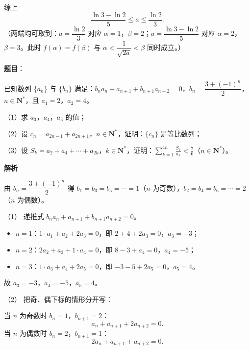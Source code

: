 \begin{answer}
综上
\nopagebreak[4]
\[\frac{\ln3-\ln2}{5}\leqslant a\leqslant\frac{\ln2}{3}.\]
（两端均可取到：$a=\dfrac{\ln2}{3}$ 对应 $\alpha=1$，$\beta=2$；$a=\dfrac{\ln3-\ln2}{5}$ 对应 $\alpha=2$，$\beta=3$。此时 $f(\alpha)=f(\beta)$ 与 $\alpha<\dfrac{1}{\sqrt{2a}}<\beta$ 同时成立。）


\end{answer}
\begin{answer}

\textbf{题目}：

已知数列 $\{a_n\}$ 与 $\{b_n\}$ 满足：$b_na_n+a_{n+1}+b_{n+1}a_{n+2}=0$，$b_n=\dfrac{3+(-1)^n}{2}$，$n\in\mathbf{N}^*$，且 $a_1=2$，$a_2=4$。

（1）求 $a_3$，$a_4$，$a_5$ 的值；

（2）设 $c_n=a_{2n-1}+a_{2n+1}$，$n\in\mathbf{N}^*$，证明：$\{c_n\}$ 是等比数列；

（3）设 $S_k=a_2+a_4+\cdots+a_{2k}$，$k\in\mathbf{N}^*$，证明：$\displaystyle\sum_{k=1}^{4n}\frac{S_k}{a_k}<\frac76$（$n\in\mathbf{N}^*$）。

\textbf{解析}

由 $b_n=\dfrac{3+(-1)^n}{2}$ 得 $b_1=b_3=b_5=\cdots=1$（$n$ 为奇数），$b_2=b_4=b_6=\cdots=2$（$n$ 为偶数）。

（1） 递推式 $b_na_n+a_{n+1}+b_{n+1}a_{n+2}=0$。

\begin{itemize}
\item $n=1$：$1\cdot a_1+a_2+2a_3=0$，即 $2+4+2a_3=0$，$a_3=-3$；
\item $n=2$：$2a_2+a_3+1\cdot a_4=0$，即 $8-3+a_4=0$，$a_4=-5$；
\item $n=3$：$1\cdot a_3+a_4+2a_5=0$，即 $-3-5+2a_5=0$，$a_5=4$。
\end{itemize}

故 $a_3=-3$，$a_4=-5$，$a_5=4$。

（2） 把奇、偶下标的情形分开写：

当 $n$ 为奇数时 $b_n=1$，$b_{n+1}=2$：
\nopagebreak[4]
\[a_n+a_{n+1}+2a_{n+2}=0.\tag{1}\]
当 $n$ 为偶数时 $b_n=2$，$b_{n+1}=1$：
\nopagebreak[4]
\[2a_n+a_{n+1}+a_{n+2}=0.\tag{2}\]


\end{answer}
